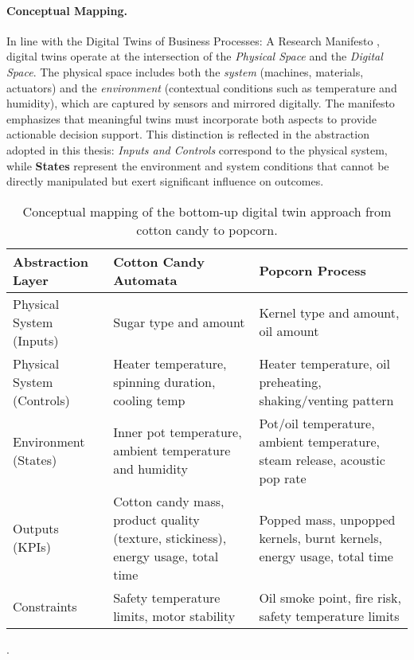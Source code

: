 \paragraph{Conceptual Mapping.}
In line with the Digital Twins of Business Processes: A Research Manifesto \cite{FORNARI2025101477}, digital twins operate at the intersection of the \textit{Physical Space} and the \textit{Digital Space}. The physical space includes both the \textit{system} (machines, materials, actuators) and the \textit{environment} (contextual conditions such as temperature and humidity), which are captured by sensors and mirrored digitally. The manifesto emphasizes that meaningful twins must incorporate both aspects to provide actionable decision support. This distinction is reflected in the abstraction adopted in this thesis: \textit{Inputs and Controls} correspond to the physical system, while \textbf{States} represent the environment and system conditions that cannot be directly manipulated but exert significant influence on outcomes.

\begin{table}[h!]
  \begin{center}
    \caption{Conceptual mapping of the bottom-up digital twin approach from cotton candy to popcorn.}
    \label{tab:transferability}
    \begin{tabular}{p{3.5cm}|p{5cm}|p{5cm}}
      \textbf{Abstraction Layer} & \textbf{Cotton Candy Automata} & \textbf{Popcorn Process} \\
      \hline
      Physical System (Inputs) & Sugar type and amount & Kernel type and amount, oil amount \\
      Physical System (Controls) & Heater temperature, spinning duration, cooling temp & Heater temperature, oil preheating, shaking/venting pattern \\
      Environment (States) & Inner pot temperature, ambient temperature and humidity & Pot/oil temperature, ambient temperature, steam release, acoustic pop rate \\
      Outputs (KPIs) & Cotton candy mass, product quality (texture, stickiness), energy usage, total time & Popped mass, unpopped kernels, burnt kernels, energy usage, total time \\
      Constraints & Safety temperature limits, motor stability & Oil smoke point, fire risk, safety temperature limits \\
    \end{tabular}
  \end{center}
  .
\end{table} 

